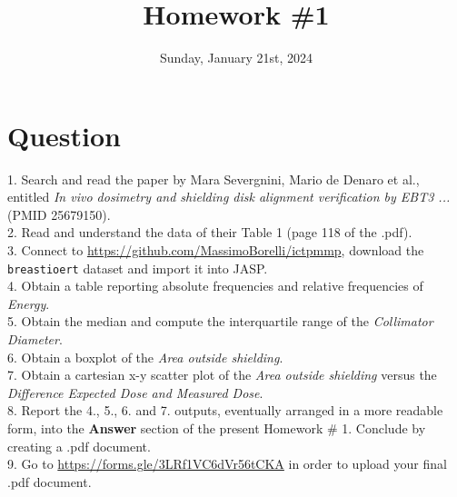 \documentclass[
	12pt, %
]{fphw}
\title{Homework \#1} %
\author{ } %
\date{Sunday, January 21st, 2024} %
\institute{The \textit{Abdus Salam} International Centre for Theoretical Physics \\ Master of Advanced Studies in Medical Physics} %
\begin{document}
\maketitle %

\section*{Question}

\begin{problem}

1. Search and read the paper by Mara Severgnini, Mario de Denaro et al., entitled \textit{In vivo dosimetry and shielding disk alignment verification by EBT3 ...} (PMID 25679150). \\
 
2. Read and understand the data of their Table 1 (page 118 of the .pdf).\\

3. Connect to \url{https://github.com/MassimoBorelli/ictpmmp}, download the \texttt{breastioert} dataset and import it into \textsf{JASP}.\\

4. Obtain a table reporting absolute frequencies and relative frequencies of \textit{Energy}.\\

5. Obtain the median and compute the interquartile range of the \textit{Collimator Diameter}. \\

6. Obtain a boxplot of the \textit{Area outside shielding}.\\

7. Obtain a cartesian x-y scatter plot of the \textit{Area outside shielding} versus the  \textit{Difference Expected Dose and Measured Dose}. \\

8. Report the 4., 5., 6. and 7. outputs, eventually arranged in a more readable form, into the \textbf{Answer} section of the present Homework \# 1. Conclude by creating a .pdf document.\\

9. Go to \url{https://forms.gle/3LRf1VC6dVr56tCKA} in order to upload your final .pdf document.


\end{problem}
\end{document}
